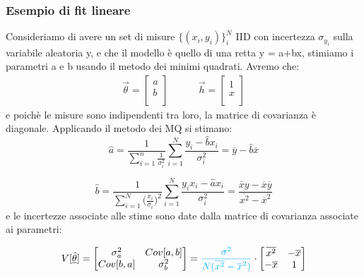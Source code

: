 \documentclass[11pt,a4paper]{book}
\begin{document}
\subsubsection{Esempio di fit lineare}

Consideriamo di avere un set di misure $\{(x_i,y_i) \}_{i}^N$ IID con incertezza $\sigma_{y_{i}}$ sulla variabile aleatoria y, e che il modello \`{e} quello di una retta y = a+bx, stimiamo i parametri a e b usando il metodo dei minimi quadrati. Avremo che:
\begin{align*}
\vec{\theta} =
	\begin{bmatrix}
		a \\
		b \\ 
	\end{bmatrix}
	\quad \quad \quad\vec{h}=
	\begin{bmatrix}
		1 \\
		x \\
	\end{bmatrix}
\end{align*}
e poich\`{e} le misure sono indipendenti tra loro, la matrice di covarianza \`{e} diagonale. Applicando il metodo dei MQ si stimano:
\begin{equation*}
	\hat{a} = \dfrac{1}{\sum_{i=1}^n \frac{1}{\sigma_i^2}}\sum_{i=1}^N \dfrac{y_i -\hat{b}x_i}{\sigma_i^2} = \overline{y} - \hat{b} \overline{x}
\end{equation*}

\begin{equation*}
	\hat{b} = \dfrac{1}{\sum_{i=1}^N \big (\frac{x_i}{\sigma_i} \big )^2}\sum_{i=1}^N \dfrac{y_ix_i -\hat{a}x_i}{\sigma_i^2} = \dfrac{\overline xy -\overline{x}\overline{y}}{\overline{x^2} - \overline{x}^2}
\end{equation*}
\newline
e le incertezze associate alle stime sono date dalla matrice di covarianza associate ai parametri:

\begin{align*}
V[\underline{\hat{\theta}}]=
	\begin{bmatrix}
		\sigma^2_{a} & Cov[a,b] \\
		Cov[b,a] & \sigma^2_{b} \\
	\end{bmatrix}
	= \textcolor{cyan}{\dfrac{\sigma^2}{N(\overline{x^2} - \overline{x}^2 )}} \cdot 
	\begin{bmatrix}
		\overline{x^2} & - \overline{x} \\
		- \overline{x} & 1 \\
	\end{bmatrix}
\end{align*} 
\end{document}
